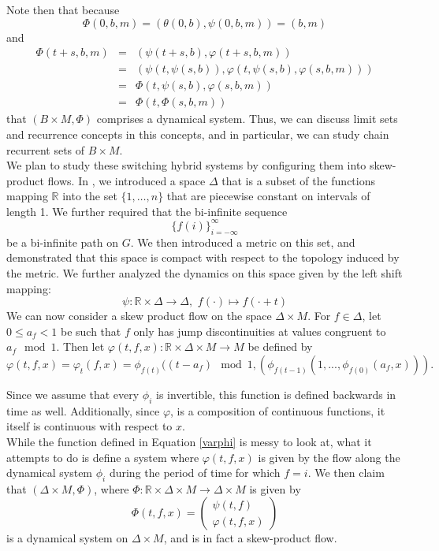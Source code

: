 \documentclass[11pt]{article}
\begin{document}
\noindent Note then that because $$\Phi(0,b,m)=(\theta(0,b), \psi(0,b,m))=(b,m)$$ and 
\begin{eqnarray*}
\Phi(t+s,b,m)&=&(\psi(t+s,b),\varphi(t+s,b,m))\\
&=&(\psi(t,\psi(s,b)),\varphi(t,\psi(s,b),\varphi(s,b,m)))\\
&=&\Phi(t,\psi(s,b),\varphi(s,b,m))\\
&=&\Phi(t,\Phi(s,b,m))
\end{eqnarray*}
that $(B\times M, \Phi)$ comprises a dynamical system.  Thus, we can discuss limit sets and recurrence concepts in this concepts, and in particular, we can study chain recurrent sets of $B\times M$. \\
\indent We plan to study these switching hybrid systems by configuring them into skew-product flows.  In \cite{Ayers2013}, we introduced a space $\Delta$ that is a subset of the functions mapping $\mathbb{R}$ into the set $\{1,\ldots,n\}$ that are piecewise constant on intervals of length 1. We further required that the bi-infinite sequence $$\{f(i)\}_{i=-\infty}^\infty$$ be a bi-infinite path on $G$.  We then introduced a metric on this set, and demonstrated that this space is compact with respect to the topology induced by the metric.  We further analyzed the dynamics on this space given by the left shift mapping:
$$\psi:\mathbb{R}\times\Delta\rightarrow\Delta,\,\, f(\cdot)\mapsto f(\cdot+ t)$$
We can now consider a skew product flow on the space $\Delta\times M$.  For $f \in \Delta$, let $0\leq a_f<1$ be such that $f$ only has jump discontinuities at values congruent to $a_f\mod 1$.  Then let $\varphi(t,f,x):\mathbb{R} \times \Delta\times M \rightarrow M$ be defined by
\begin{equation}\label{varphi}
\varphi (t,f,x) = \varphi_t(f,x)= \phi_{f(t)}((t-a_f)\mod1,(\phi_{f(t-1)}(1,...,\phi_{f(0)}(a_f,x))). 
\end{equation}


Since we assume that every $\phi_i$ is invertible, this function is defined backwards in time as well. Additionally, since $\varphi$, is a composition of continuous functions, it itself is continuous with respect to $x$. \\
\indent While the function defined in Equation \ref{varphi} is messy to look at, what it attempts to do is define a system where $\varphi(t,f,x)$ is given by the flow along the dynamical system $\phi_i$ during the period of time for which $f = i$.  We then claim that $(\Delta\times M, \Phi)$, where $\Phi:\mathbb{R}\times\Delta\times M\rightarrow \Delta\times M$ is given by
\begin{equation*}\label{dynsys}
\Phi(t,f,x) = \left (
\begin{array}{cc}
\psi(t,f)\\
\varphi(t,f,x)
\end{array} \right ) 
\end{equation*}
is a dynamical system on $\Delta\times M$, and is in fact a skew-product flow.
\end{document}
